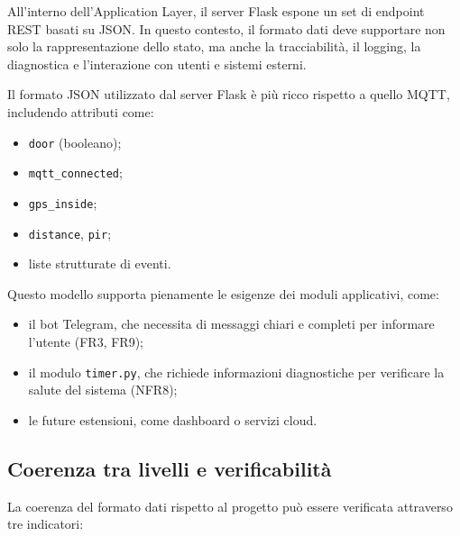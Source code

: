 All’interno dell’Application Layer, il server Flask
espone un set di endpoint REST basati su JSON. In questo contesto, il
formato dati deve supportare non solo la rappresentazione dello
stato, ma anche la tracciabilità, il logging, la diagnostica e
l’interazione con utenti e sistemi esterni.



Il formato
JSON utilizzato dal server Flask è più ricco rispetto a quello
MQTT, includendo attributi come:

\begin{itemize}


   \item
\texttt{door}
(booleano);

    \item
\texttt{mqtt\_connected};


   \item
\texttt{gps\_inside};


   \item
\texttt{distance},
\texttt{pir};


   \item
liste
strutturate di eventi.

\end{itemize}



Questo
modello supporta pienamente le esigenze dei moduli applicativi,
come:

\begin{itemize}


   \item
il
bot Telegram, che necessita di messaggi chiari e completi per
informare l’utente (FR3, FR9);

    \item
il
modulo \texttt{timer.py},
che richiede informazioni diagnostiche per verificare la salute del
sistema (NFR8);

    \item
le
future estensioni, come dashboard o servizi
cloud.

\end{itemize}



\subsection*{Coerenza
tra livelli e verificabilità}

La coerenza del formato dati
rispetto al progetto può essere verificata attraverso tre
indicatori:


